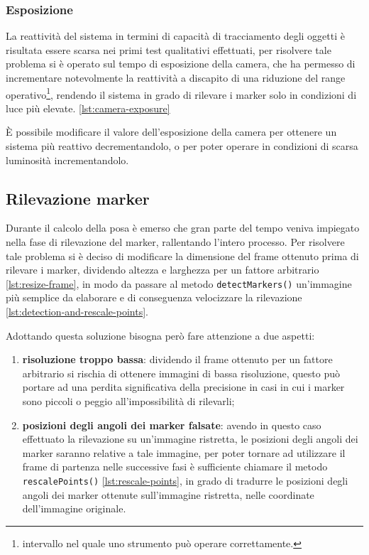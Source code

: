 \documentclass[12pt,a4paper,openright,twoside]{book}
\begin{document}
\subsubsection{Esposizione}
La reattività del sistema in termini di capacità di tracciamento degli oggetti è risultata essere scarsa nei primi test qualitativi effettuati, per risolvere tale problema si è operato sul tempo di esposizione della camera, che ha permesso di incrementare notevolmente la reattività a discapito di una riduzione del range operativo\footnote{intervallo nel quale uno strumento può operare correttamente.}, rendendo il sistema in grado di rilevare i marker solo in condizioni di luce più elevate. \cref{lst:camera-exposure}

È possibile modificare il valore dell'esposizione della camera per ottenere un sistema più reattivo decrementandolo, o per poter operare in condizioni di scarsa luminosità incrementandolo.

\subsection{Rilevazione marker} \label{subsec:rilevazione_marker}
Durante il calcolo della posa è emerso che gran parte del tempo veniva impiegato nella fase di rilevazione del marker, rallentando l'intero processo. Per risolvere tale problema si è deciso di modificare la dimensione del frame ottenuto prima di rilevare i marker, dividendo altezza e larghezza per un fattore arbitrario \cref{lst:resize-frame}, in modo da passare al metodo \texttt{detectMarkers()} un'immagine più semplice da elaborare e di conseguenza velocizzare la rilevazione \cref{lst:detection-and-rescale-points}.

Adottando questa soluzione bisogna però fare attenzione a due aspetti:
\begin{enumerate}
	\item \textbf{risoluzione troppo bassa}: dividendo il frame ottenuto per un fattore arbitrario si rischia di ottenere immagini di bassa risoluzione, questo può portare ad una perdita significativa della precisione in casi in cui i marker sono piccoli o peggio all'impossibilità di rilevarli;
	\item \textbf{posizioni degli angoli dei marker falsate}: avendo in questo caso effettuato la rilevazione su un'immagine ristretta, le posizioni degli angoli dei marker saranno relative a tale immagine, per poter tornare ad utilizzare il frame di partenza nelle successive fasi è sufficiente chiamare il metodo \texttt{rescalePoints()} \cref{lst:rescale-points}, in grado di tradurre le posizioni degli angoli dei marker ottenute sull'immagine ristretta, nelle coordinate dell'immagine originale.
\end{enumerate}
\end{document}
